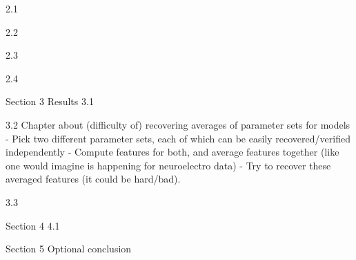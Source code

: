 \documentclass[12pt,letterpaper]{report}
\begin{document}

2.1

2.2

2.3

2.4

Section 3
Results
3.1

3.2
Chapter about (difficulty of) recovering averages of parameter sets for models
- Pick two different parameter sets, each of which can be easily recovered/verified independently
- Compute features for both, and average features together (like one would imagine is happening for neuroelectro data)
- Try to recover these averaged features (it could be hard/bad).

3.3

Section 4
4.1

Section 5
Optional conclusion
{\singlespace

}


%
\renewcommand{\chaptername}{APPENDIX}
%

\end{document}
